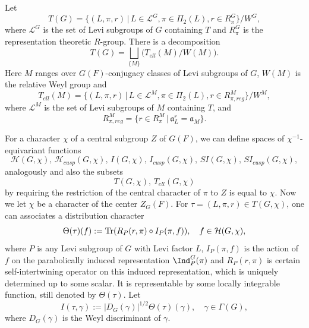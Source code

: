 \documentclass[11pt,letterpaper]{amsart}
\numberwithin{equation}{section}
\begin{document}
Let 
\[
T(G) = \{(L, \pi, r) \, | \, L \in \mathcal{L}^{G}, \pi \in \Pi_2(L), r \in R^{G}_{\pi}\} / W^{G},
\]
where $\mathcal{L}^{G}$ is the set of Levi subgroups of $G$ containing $T$ and $R^{G}_{\pi}$ is the representation theoretic $R$-group. There is a decomposition
\[
T(G) = \bigsqcup_{\{M\}} \Big( T_{ell}(M) / W(M) \Big).
\]
Here $M$ ranges over $G(F)$-conjugacy classes of Levi subgroups of $G$, $W(M)$ is the relative Weyl group and
\[
T_{ell}(M) = \{(L, \pi, r) \, | \, L \in \mathcal{L}^{M}, \pi \in \Pi_2(L), r \in R^{M}_{\pi, reg}\} / W^{M},
\]
where $\mathcal{L}^{M}$ is the set of Levi subgroups of $M$ containing $T$, and 
\[
R^{M}_{\pi, reg} = \{r \in R^{M}_{\pi} \, | \, \mathfrak{a}^{r}_L = \mathfrak{a}_M \}.
\] 

For a character $\chi$ of a central subgroup $Z$ of $G(F)$, we can define spaces of $\chi^{-1}$-equivariant functions
\[
\mathcal{H}(G, \chi), \, \mathcal{H}_{cusp}(G, \chi), \, I(G, \chi), \, I_{cusp}(G, \chi), \, SI(G, \chi), \, SI_{cusp}(G, \chi), \]
analogously and also the subsets 
\[
T(G, \chi), \, T_{ell}(G, \chi)
\] 
by requiring the restriction of the central character of $\pi$ to $Z$ is equal to $\chi$. Now we let $\chi$ be a character of the center $Z_{G}(F)$. For $\tau = (L, \pi, r) \in T(G, \chi)$, one can associates a distribution character
\[
\Theta(\tau)(f) := {\rm Tr} (R_{P}(r, \pi) \circ I_{P}(\pi, f)), \quad f \in \mathcal{H}(G, \chi),
\]
where $P$ is any Levi subgroup of $G$ with Levi factor $L$, $I_{P}(\pi, f)$ is the action of $f$ on the parabolically induced representation $\Ind^{G}_{P}(\pi)$ and $R_{P}(r, \pi)$ is certain self-intertwining operator on this induced representation, which is uniquely determined up to some scalar. It is representable by some locally integrable function, still denoted by $\Theta(\tau)$. Let
\[
I(\tau, \gamma) := |D_{G}(\gamma)|^{1/2} \Theta(\tau)(\gamma), \quad \gamma \in \Gamma(G),
\]
where $D_{G}(\gamma)$ is the Weyl discriminant of $\gamma$.
\end{document}

